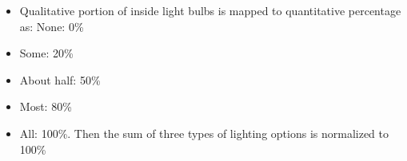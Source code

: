 \begin{itemize}
\item Qualitative portion of inside light bulbs is mapped to quantitative percentage as: None: 0\%
\item Some: 20\%
\item About half: 50\%
\item Most: 80\%
\item All: 100\%. Then the sum of three types of lighting options is normalized to 100\%
\end{itemize}
